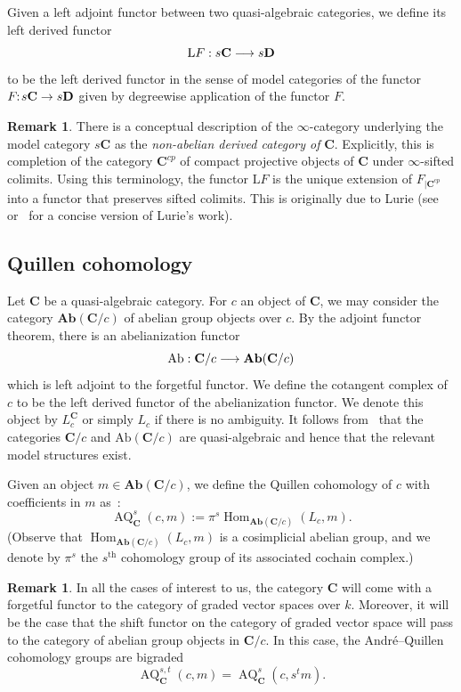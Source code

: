 \documentclass[10pt]{amsart}
\theoremstyle{definition}\newtheorem{defi}[theo]{Definition}\newtheorem{rema}[theo]{Remark}\newtheorem{exam}[theo]{Example}\newtheorem{exem}[theo]{Example}\newtheorem{nota}[theo]{Notation}
\renewcommand{\rm}[1]{{\mathrm{#1}}}
\DeclareMathOperator{\Hom}{Hom}
\DeclareMathOperator{\AQ}{AQ}
\newcommand{\bAb}{\mathbf{Ab}}
\newcommand{\rAb}{\mathrm{Ab}}
\newcommand{\bfC}{\mathbf{C}}
\newcommand{\bfD}{\mathbf{D}}
\renewcommand{\L}{\mathrm{L}}
\renewcommand*{\to}{\mathchoice{\longrightarrow}{\rightarrow}{\rightarrow}{\rightarrow}}
\begin{document}
Given a left adjoint functor between two quasi-algebraic categories, we define its left derived functor
\[
\L F: s\bfC\to s\bfD
\]
to be the left derived functor in the sense of model categories of the functor $F\!\!:\! s\bfC\to s\bfD$ given by degreewise application of the functor $F$.

\begin{rema}\label{remark : non-abelian derived}
There is a conceptual description of the $\infty$-category underlying the model category $s\bfC$ as the \emph{non-abelian derived category of} $\bfC$. Explicitly, this is completion of the category $\bfC^{cp}$ of compact projective objects of $\bfC$ under $\infty$-sifted colimits. Using this terminology, the functor $\L F$ is the unique extension of $F_{|\bfC^{cp}}$ into a functor that preserves sifted colimits. This is originally due to Lurie (see~\cite[Section~5.5.8]{luriehigher} or~\cite[Section~5.1.1]{kestupurity} for a concise version of Lurie's work).
\end{rema}


\subsection{Quillen cohomology}

Let $\bfC$ be a quasi-algebraic category. For $c$ an object of $\bfC$, we may consider the category $\bAb(\bfC/c)$ of abelian group objects over $c$. By the adjoint functor theorem, there is an abelianization functor
\[
\rAb: \bfC/c\to\bAb(\bfC/c)
\]
which is left adjoint to the forgetful functor. We define the cotangent complex of $c$ to be the left derived functor of the abelianization functor. We denote this object by $L_c^{\bfC}$ or simply $L_c$ if there is no ambiguity. It follows from~\cite[Propositions~3.33 and 3.34]{franklandbehavior} that the categories $\bfC/c$ and $\rAb(\bfC/c)$ are quasi-algebraic and hence that the relevant model structures exist.

Given an object $m\in\bAb(\bfC/c)$, we define the Quillen cohomology of $c$ with coefficients in $m$ as~:
\[
\AQ^s_{\bfC}(c,m):=\pi^s\Hom_{\bAb(\bfC/c)}(L_c,m).
\]
(Observe that $\Hom_{\bAb(\bfC/c)}(L_c,m)$ is a cosimplicial abelian group, and we denote by $\pi^s$ the $s^{\rm{th}}$ cohomology group of its associated cochain complex.)

\begin{rema}
In all the cases of interest to us, the category $\bfC$ will come with a forgetful functor to the category of graded vector spaces over $k$. Moreover, it will be the case that the shift functor on the category of graded vector space will pass to the category of abelian group objects in $\bfC/c$. In this case, the André--Quillen cohomology groups are bigraded
\[
\AQ^{s,t}_{\bfC}(c,m)=\AQ^s_{\bfC}(c,s^tm).
\]
\end{rema}
\end{document}
